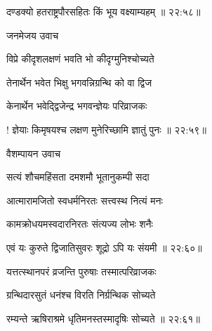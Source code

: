 {\devanagarifont दण्डक्यो हतराष्ट्रपौरसहितः किं भूय वक्ष्याम्यहम् {॥ २२:५८॥} \veg\dontdisplaylinenum }%
 

\vers


{\devanagarifont जनमेजय उवाच {\dandab}\dontdisplaylinenum  }%
 
\nemsloka 
{\devanagarifont विप्रे कीदृशलक्षणं भवति भो कीदृग्मुनिश्चोच्यते }%
  \dontdisplaylinenum

\nemslokab

{\devanagarifont तेनार्थेन भवेत भिक्षु भगवन्निग्रन्थि को वा द्विज  \danda\dontdisplaylinenum }%
 
\nemslokac

{\devanagarifont केनार्थेन भवेद्द्विजेन्द्र भगवन्ज्ञेयः परिव्राजकः }%
  \dontdisplaylinenum


\nemslokad

{\devanagarifont ! ज्ञेयाः किमृषयश्च लक्षण मुनेरिच्छामि ज्ञातुं पुनः {॥ २२:५९॥} \veg\dontdisplaylinenum }%
 
\vers


{\devanagarifont वैशम्पायन उवाच {\dandab}\dontdisplaylinenum  }%
 
\nemsloka 
{\devanagarifont सत्यं शौचमहिंसता दमशमौ भूतानुकम्पी सदा }%
  \dontdisplaylinenum

\nemslokab

{\devanagarifont आत्मारामजितो स्वधर्मनिरतः सत्त्वस्थ नित्यं मनः  \danda\dontdisplaylinenum }%
 
\nemslokac

{\devanagarifont कामक्रोधयमस्वदारनिरतः संत्यज्य लोभः शनैः }%
  \dontdisplaylinenum


\nemslokad

{\devanagarifont एवं यः कुरुते द्विजातिसुवरः शूद्रो ऽपि यः संयमी {॥ २२:६०॥} \veg\dontdisplaylinenum }%
 
\ujvers{}

\nemslokab

{\devanagarifont यत्तत्स्थानपरं व्रजन्ति पुरुषाः तस्मात्परिव्राजकः  \danda\dontdisplaylinenum }%
 
\nemslokac

{\devanagarifont ग्रन्थिदारसुतं धनंश्च विरति निर्ग्रन्थिक सोच्यते }%
  \dontdisplaylinenum


\nemslokad

{\devanagarifont रम्यन्ते ऋषिराश्रमे धृतिमनस्तस्मादृषिः सोच्यते {॥ २२:६१॥} \veg\dontdisplaylinenum }%
 
